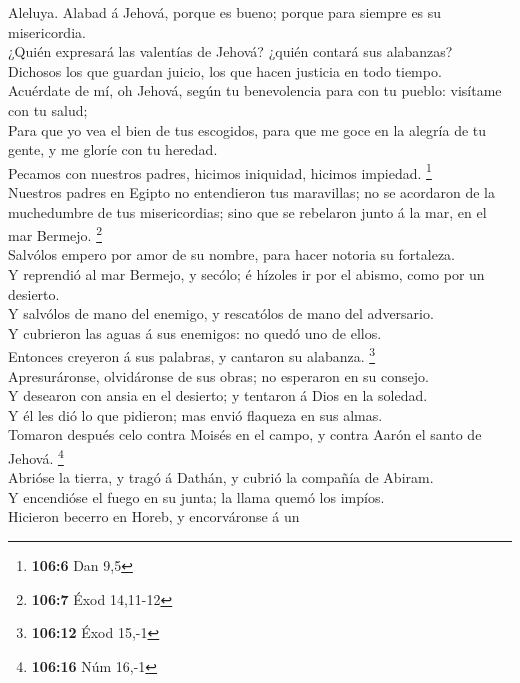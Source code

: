  Aleluya. Alabad á Jehová, porque es bueno; porque para
siempre es su misericordia.\\
 ¿Quién expresará las valentías de Jehová? ¿quién contará
sus alabanzas?\\
 Dichosos los que guardan juicio, los que hacen justicia en
todo tiempo.\\
 Acuérdate de mí, oh Jehová, según tu benevolencia para con
tu pueblo: visítame con tu salud;\\
 Para que yo vea el bien de tus escogidos, para que me goce
en la alegría de tu gente, y me gloríe con tu heredad.\\
 Pecamos con nuestros padres, hicimos iniquidad, hicimos
impiedad. \footnote{\textbf{106:6} Dan 9,5}\\
 Nuestros padres en Egipto no entendieron tus maravillas; no
se acordaron de la muchedumbre de tus misericordias; sino que se
rebelaron junto á la mar, en el mar Bermejo. \footnote{\textbf{106:7}
  Éxod 14,11-12}\\
 Salvólos empero por amor de su nombre, para hacer notoria
su fortaleza.\\
 Y reprendió al mar Bermejo, y secólo; é hízoles ir por el
abismo, como por un desierto.\\
 Y salvólos de mano del enemigo, y rescatólos de mano del
adversario.\\
 Y cubrieron las aguas á sus enemigos: no quedó uno de
ellos.\\
 Entonces creyeron á sus palabras, y cantaron su alabanza.
\footnote{\textbf{106:12} Éxod 15,-1}\\
 Apresuráronse, olvidáronse de sus obras; no esperaron en
su consejo.\\
 Y desearon con ansia en el desierto; y tentaron á Dios en
la soledad.\\
 Y él les dió lo que pidieron; mas envió flaqueza en sus
almas.\\
 Tomaron después celo contra Moisés en el campo, y contra
Aarón el santo de Jehová. \footnote{\textbf{106:16} Núm 16,-1}\\
 Abrióse la tierra, y tragó á Dathán, y cubrió la compañía
de Abiram.\\
 Y encendióse el fuego en su junta; la llama quemó los
impíos.\\
 Hicieron becerro en Horeb, y encorváronse á un
